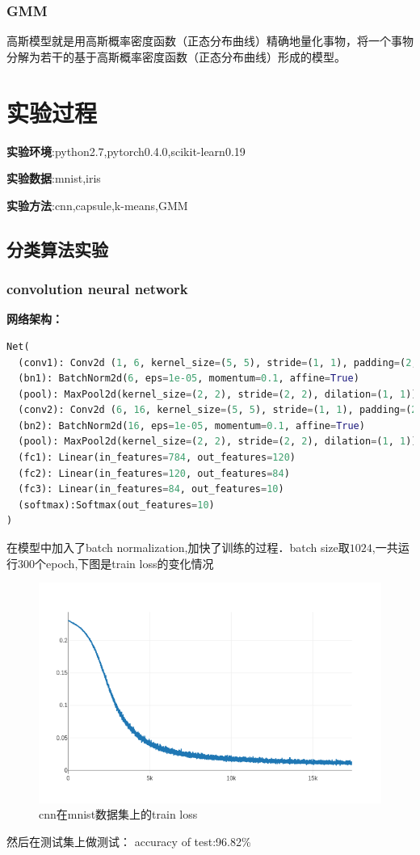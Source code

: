 \documentclass{article}
\begin{document}
	\subsubsection{GMM}
	高斯模型就是用高斯概率密度函数（正态分布曲线）精确地量化事物，将一个事物分解为若干的基于高斯概率密度函数（正态分布曲线）形成的模型。

\section{实验过程}
\textbf{实验环境}:python2.7,pytorch0.4.0\cite{pytorch},scikit-learn0.19\cite{scikit-learn}

\textbf{实验数据}:mnist,iris

\textbf{实验方法}:cnn,capsule,k-means,GMM
\subsection{分类算法实验}
\subsubsection{convolution neural network}
\textbf{网络架构：}
\begin{lstlisting}[language=python]
Net(
  (conv1): Conv2d (1, 6, kernel_size=(5, 5), stride=(1, 1), padding=(2, 2))
  (bn1): BatchNorm2d(6, eps=1e-05, momentum=0.1, affine=True)
  (pool): MaxPool2d(kernel_size=(2, 2), stride=(2, 2), dilation=(1, 1))
  (conv2): Conv2d (6, 16, kernel_size=(5, 5), stride=(1, 1), padding=(2, 2))
  (bn2): BatchNorm2d(16, eps=1e-05, momentum=0.1, affine=True)
  (pool): MaxPool2d(kernel_size=(2, 2), stride=(2, 2), dilation=(1, 1))
  (fc1): Linear(in_features=784, out_features=120)
  (fc2): Linear(in_features=120, out_features=84)
  (fc3): Linear(in_features=84, out_features=10)
  (softmax):Softmax(out_features=10)
)
\end{lstlisting}

在模型中加入了batch normalization,加快了训练的过程．batch size取$1024$,一共运行$300$个epoch,下图是train loss的变化情况

\begin{figure}[htb]
	\centering\includegraphics[scale=0.6]{cnn_loss}
	\caption{cnn在mnist数据集上的train loss}
\end{figure}
然后在测试集上做测试：
accuracy of test:96.82\%
\end{document}
